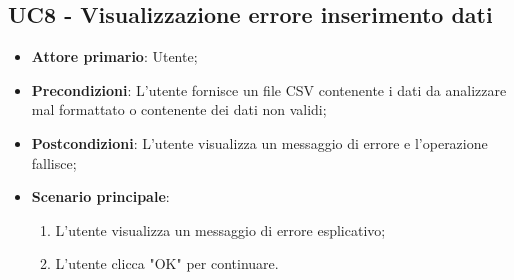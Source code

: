 \subsection{UC8 - Visualizzazione errore inserimento dati}
\begin{itemize}
	\item \textbf{Attore primario}: Utente;
	\item \textbf{Precondizioni}: L'utente fornisce un file CSV contenente i dati da analizzare mal formattato o contenente dei dati non validi;
	\item \textbf{Postcondizioni}: L'utente visualizza un messaggio di errore e l'operazione fallisce;
	\item \textbf{Scenario principale}:
		\begin{enumerate}
			\item L'utente visualizza un messaggio di errore esplicativo;
			\item L'utente clicca "OK" per continuare.
		\end{enumerate}
\end{itemize}